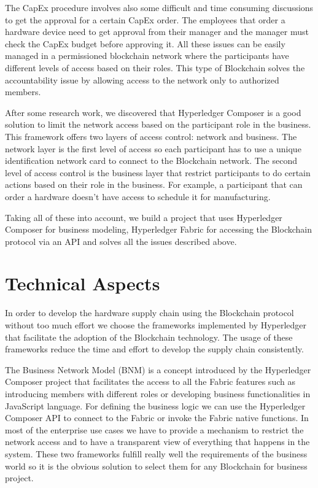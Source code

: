 The CapEx procedure involves also some difficult and time consuming discussions to get the approval for a certain CapEx order. The employees that order a hardware device need to get approval from their manager and the manager must check the CapEx budget before approving it. All these issues can be easily managed in a permissioned blockchain network where the participants have different levels of access based on their roles. This type of Blockchain solves the accountability issue by allowing access to the network only to authorized members. 

After some research work, we discovered that Hyperledger Composer is a good solution to limit the network access based on the participant role in the business. This framework offers two layers of access control: network and business. The network layer is the first level of access so each participant has to use a unique identification network card to connect to the Blockchain network. The second level of access control is the business layer that restrict participants to do certain actions based on their role in the business. For example, a participant that can order a hardware doesn't have access to schedule it for manufacturing.

Taking all of these into account, we build a project that uses Hyperledger Composer for business modeling, Hyperledger Fabric for accessing the Blockchain protocol via an API and solves all the issues described above.


\section{Technical Aspects}
\label{sec:chapter3-section2}
In order to develop the hardware supply chain using the Blockchain protocol without too much effort we choose the frameworks implemented by Hyperledger that facilitate the adoption of the Blockchain technology. The usage of these frameworks reduce the time and effort to develop the supply chain consistently.

The Business Network Model (BNM) is a concept introduced by the Hyperledger Composer project that facilitates the access to all the Fabric features such as introducing members with different roles or developing business functionalities in JavaScript language. For defining the business logic we can use the Hyperledger Composer API to connect to the Fabric or invoke the Fabric native functions. In most of the enterprise use cases we have to provide a mechanism to restrict the network access and to have a transparent view of everything that happens in the system. 
These two frameworks fulfill really well the requirements of the business world so
it is the obvious solution to select them for any Blockchain for business project.

